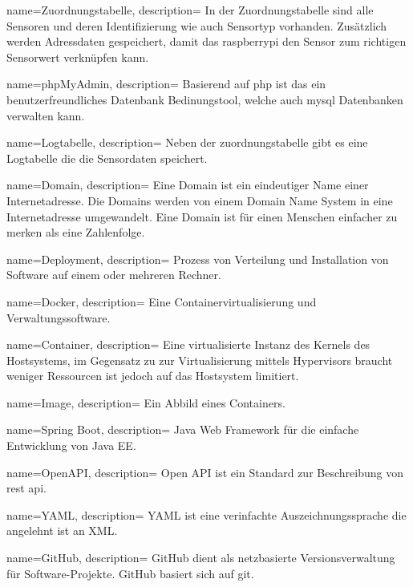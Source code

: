 {
	name=Zuordnungstabelle,
	description={
		In der Zuordnungstabelle sind alle Sensoren und deren Identifizierung wie auch Sensortyp vorhanden. Zusätzlich werden Adressdaten gespeichert, damit das \gls{raspberrypi} den Sensor zum richtigen Sensorwert verknüpfen kann.
	}
}

{
	name=phpMyAdmin,
	description={
		Basierend auf \gls{php} ist das ein benutzerfreundliches Datenbank Bedinungstool, welche auch \gls{mysql} Datenbanken verwalten kann.
	}
}

{
	name=Logtabelle,
	description={
		Neben der \gls{zuordnungstabelle} gibt es eine Logtabelle die die Sensordaten speichert.
	}
}

{
	name=Domain,
	description={
		Eine Domain ist ein eindeutiger Name einer Internetadresse. Die Domains werden von einem Domain Name System in eine Internetadresse umgewandelt. Eine Domain ist für einen Menschen einfacher zu merken als eine Zahlenfolge.
	}
}

{
	name=Deployment,
	description={
		Prozess von Verteilung und Installation von Software auf einem oder mehreren Rechner.
	}
}

{
	name=Docker,
	description={
		Eine Containervirtualisierung und Verwaltungssoftware.\cite{Docker}
	}
}

{
	name=Container,
	description={
		Eine virtualisierte Instanz des Kernels des Hostsystems, im Gegensatz zu zur Virtualisierung mittels Hypervisors braucht weniger Ressourcen ist jedoch auf das Hostsystem limitiert.
	}
}

{
	name=Image,
	description={
		Ein Abbild eines Containers.
	}
}

{
	name=Spring Boot,
	description={
		Java Web Framework für die einfache Entwicklung von Java EE.
	}
}

{
	name=OpenAPI,
	description={
		Open API ist ein Standard zur Beschreibung von \gls{rest} \gls{api}.\cite{OpenAPI}
	}
}

{
	name=YAML,
	description={
		YAML ist eine verinfachte Auszeichnungssprache die angelehnt ist an XML.\cite{YAML}
	}
}

{
	name=GitHub,
	description={
		GitHub dient als netzbasierte Versionsverwaltung für Software-Projekte. GitHub basiert sich auf \gls{git}.
	}
}

